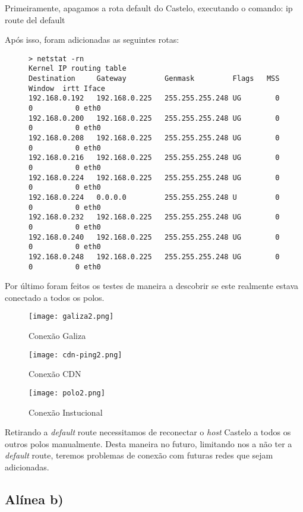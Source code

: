 \documentclass{article}
\begin{document}
Primeiramente, apagamos a rota default do Castelo, executando o comando: ip route del default

Após isso, foram adicionadas as seguintes rotas:
\begin{figure}[h]
    \centering
    \begin{lstlisting}
> netstat -rn                                                          
Kernel IP routing table
Destination     Gateway         Genmask         Flags   MSS Window  irtt Iface
192.168.0.192   192.168.0.225   255.255.255.248 UG        0 0          0 eth0
192.168.0.200   192.168.0.225   255.255.255.248 UG        0 0          0 eth0
192.168.0.208   192.168.0.225   255.255.255.248 UG        0 0          0 eth0
192.168.0.216   192.168.0.225   255.255.255.248 UG        0 0          0 eth0
192.168.0.224   192.168.0.225   255.255.255.248 UG        0 0          0 eth0
192.168.0.224   0.0.0.0         255.255.255.248 U         0 0          0 eth0
192.168.0.232   192.168.0.225   255.255.255.248 UG        0 0          0 eth0
192.168.0.240   192.168.0.225   255.255.255.248 UG        0 0          0 eth0
192.168.0.248   192.168.0.225   255.255.255.248 UG        0 0          0 eth0
    \end{lstlisting}
\end{figure}

Por último foram feitos os testes de maneira a descobrir se este realmente estava conectado a todos os polos.

\begin{figure}[h]
    \centering
    \texttt{[image: galiza2.png]}
    \caption{Conexão Galiza}
\end{figure}
\pagebreak
\begin{figure}[h]
    \centering
    \texttt{[image: cdn-ping2.png]}
    \caption{Conexão CDN}
\end{figure}

\begin{figure}[h]
    \centering
    \texttt{[image: polo2.png]}
    \caption{Conexão Instucional}
\end{figure}

Retirando a \emph{default} route necessitamos de reconectar o \emph{host} Castelo a todos os outros polos manualmente. Desta maneira no futuro, limitando nos a não ter a \emph{default} route, teremos problemas de conexão com futuras redes que sejam adicionadas.  
\subsection{Alínea b)}
\end{document}
